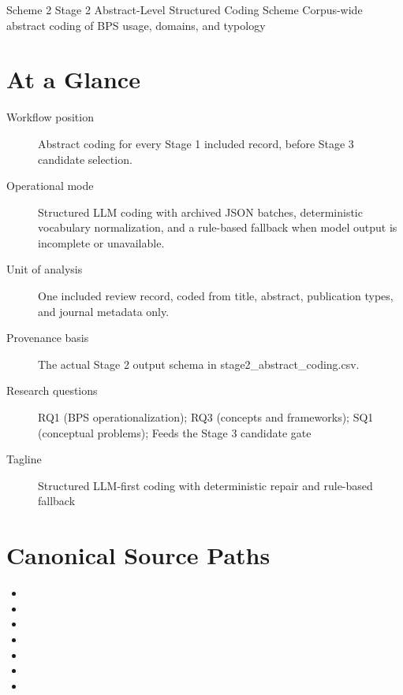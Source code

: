 \documentclass[11pt]{article}
\begin{document}
\schemeheader
  {Scheme 2}
  {Stage 2 Abstract-Level Structured Coding Scheme}
  {Corpus-wide abstract coding of BPS usage, domains, and typology}


\section*{At a Glance}
\begin{description}
\item[Workflow position] Abstract coding for every Stage 1 included record, before Stage 3 candidate selection.
\item[Operational mode] Structured LLM coding with archived JSON batches, deterministic vocabulary normalization, and a rule-based fallback when model output is incomplete or unavailable.
\item[Unit of analysis] One included review record, coded from title, abstract, publication types, and journal metadata only.
\item[Provenance basis] The actual Stage 2 output schema in stage2\_abstract\_coding.csv.
\item[Research questions] RQ1 (BPS operationalization); RQ3 (concepts and frameworks); SQ1 (conceptual problems); Feeds the Stage 3 candidate gate
\item[Tagline] Structured LLM-first coding with deterministic repair and rule-based fallback
\end{description}

\section*{Canonical Source Paths}
\begin{itemize}
\item {}
\item {}
\item {}
\item {}
\item {}
\item {}
\item {}
\end{itemize}
\end{document}
